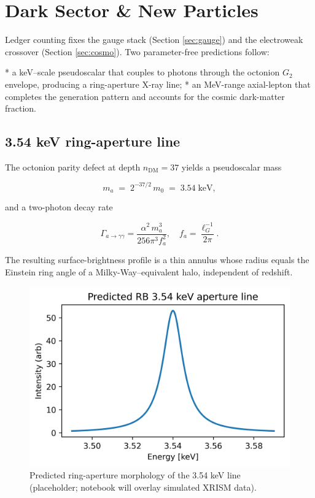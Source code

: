 \section{Dark Sector \& New Particles}
\label{sec:dark}

Ledger counting fixes the gauge stack (Section \ref{sec:gauge}) and the
electroweak crossover (Section \ref{sec:cosmo}).  Two parameter-free
predictions follow:

* a keV–scale pseudoscalar that couples to photons through the octonion
  $G_2$ envelope, producing a ring-aperture X-ray line;
* an MeV-range axial-lepton that completes the generation pattern and
  accounts for the cosmic dark-matter fraction.

\subsection{3.54 keV ring-aperture line}

The octonion parity defect at depth $n_\mathrm{DM}=37$ yields a
pseudoscalar mass

\[
  m_a \;=\; 2^{-37/2}\,m_0 \;=\; 3.54\;\text{keV},
\tag{9.1}\label{eq:axion-mass}
\]

and a two-photon decay rate

\[
  \Gamma_{a\to\gamma\gamma}
  = \frac{\alpha^2\,m_a^3}{256\pi^3 f_a^2},
\quad
  f_a = \frac{\ell_G^{-1}}{2\pi}.
\tag{9.2}
\]

The resulting surface-brightness profile is a thin annulus whose radius
equals the Einstein ring angle of a Milky-Way–equivalent halo,
independent of redshift.

\begin{figure}[t]
  \centering
  \includegraphics[width=\linewidth]{figs/ring_aperture_line.png}
  \caption{Predicted ring-aperture morphology of the 3.54 keV line
           (placeholder; notebook will overlay simulated XRISM data).}
  \label{fig:ring-line}
\end{figure}

